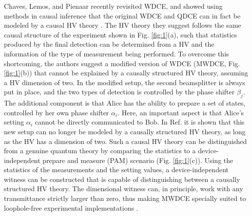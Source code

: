 \documentclass[aps,prl,twocolumn,amsmath,amssymb,nofootinbib,superscriptaddress]{revtex4-1}
\begin{document}
Chaves, Lemos, and Pienaar recently revisited WDCE, and showed using methods in causal inference \cite{pearl2009causality, Ringbauere1600162} that the original WDCE and QDCE can in fact be modeled by a causal HV theory \cite{Chaves2018}. The HV theory they suggest follows the same causal structure of the experiment shown in Fig. \ref{fig:1}(a), such that statistics produced by the final detection can be determined from a HV and the information of the type of measurement being performed.  To overcome this shortcoming, the authors suggest a modified version of WDCE (MWDCE, Fig. \ref{fig:1}(b)) that cannot be explained by a causally structured HV theory, assuming a HV dimension of two. In the modified setup, the second beamsplitter is always put in place, and the two types of detection is controlled by the phase shifter $ \beta_j $.  The additional component is that Alice has the ability to prepare a set of states, controlled by her own phase shifter $ \alpha_i $.  Here, an important aspect is that Alice's setting $ \alpha_i $ cannot be directly communicated to Bob.  In Ref. \cite{Chaves2018} it is shown that this new setup can no longer be modeled by a causally structured HV theory, as long as the HV has a dimension of two. Such a causal HV theory can be distinguished from a genuine quantum theory by comparing the statistics to a device-independent prepare and measure (PAM) scenario \cite{Bowles2014, gallego2010device} (Fig. \ref{fig:1}(c)).  Using the statistics of the measurements and the setting values, a device-independent witness \cite{Bowles2014} can be constructed that is capable of distinguishing between a causally structured HV theory. The dimensional witness can, in principle, work with any transmittance strictly larger than zero, thus making MWDCE specially suited to loophole-free experimental implementations \cite{giustina2015significant, shalm2015strong}.




 




\end{document}
